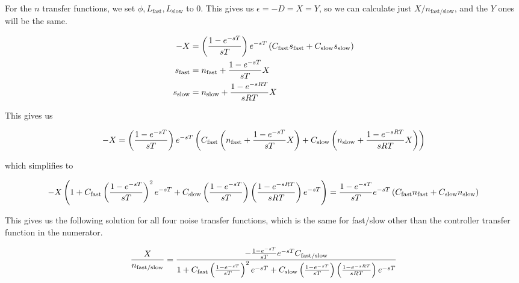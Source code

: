 \documentclass{article}
\begin{document}
    For the $n$ transfer functions, we set $\phi, L_\text{fast}, L_\text{slow}$ to 0. This gives us $\epsilon = -D = X = Y$, so we can calculate just $X / n_\text{fast/slow}$, and the $Y$ ones will be the same.

    \begin{align*}
        -X &= \left(\frac{1 - e^{-sT}}{sT}\right) e^{-sT} \left(C_{\text{fast}} s_{\text{fast}} + C_{\text{slow}} s_{\text{slow}}\right) \\
        s_{\text{fast}} &= n_{\text{fast}} + \frac{1 - e^{-sT}}{sT} X \\
        s_{\text{slow}} &= n_{\text{slow}} + \frac{1 - e^{-sRT}}{sRT} X \\
    \end{align*}

    This gives us

    \begin{align*}
        -X &= \left(\frac{1 - e^{-sT}}{sT}\right) e^{-sT} \left(C_{\text{fast}} \left(n_{\text{fast}} + \frac{1 - e^{-sT}}{sT} X\right) + C_{\text{slow}} \left(n_{\text{slow}} + \frac{1 - e^{-sRT}}{sRT} X\right)\right) \\
    \end{align*}

    which simplifies to

    \begin{align*}
        -X \left(1 + C_\text{fast} \left(\frac{1 - e^{-sT}}{sT}\right)^2 e^{-sT} + C_\text{slow} \left(\frac{1 - e^{-sT}}{sT}\right) \left(\frac{1 - e^{-sRT}}{sRT}\right)  e^{-sT}\right) = \frac{1 - e^{-sT}}{sT} e^{-sT} \left(C_\text{fast} n_\text{fast} + C_\text{slow} n_\text{slow}\right)
    \end{align*}

    This gives us the following solution for all four noise transfer functions, which is the same for fast/slow other than the controller transfer function in the numerator.

    \begin{align*}
        \frac{X}{n_\text{fast/slow}} = \frac{-\frac{1 - e^{-sT}}{sT} e^{-sT} C_{\text{fast/slow}}}{1 + C_\text{fast} \left(\frac{1 - e^{-sT}}{sT}\right)^2 e^{-sT} + C_\text{slow} \left(\frac{1 - e^{-sT}}{sT}\right) \left(\frac{1 - e^{-sRT}}{sRT}\right)  e^{-sT}}
    \end{align*}
\end{document}

